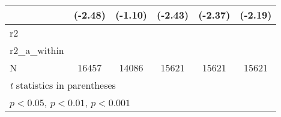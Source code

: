 {\begin{tabular}{l*{5}{c}}
            &     (-2.48)         &     (-1.10)         &     (-2.43)         &     (-2.37)         &     (-2.19)         \\
\hline
r2          &                     &                     &                     &                     &                     \\
r2\_a\_within &                     &                     &                     &                     &                     \\
N           &       16457         &       14086         &       15621         &       15621         &       15621         \\
\hline\hline
\multicolumn{6}{l}{\footnotesize \textit{t} statistics in parentheses}\\
\multicolumn{6}{l}{\footnotesize \sym{*} \(p<0.05\), \sym{**} \(p<0.01\), \sym{***} \(p<0.001\)}\\
\end{tabular}
}
